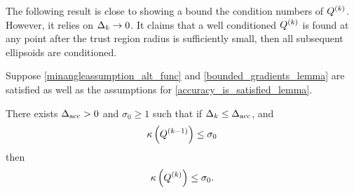 The following result is close to showing a bound the condition numbers of ${Q^{(k)}}$.
However, it relies on $\Delta_k \to 0$.
It claims that a well conditioned ${Q^{(k)}}$ is found at any point after the trust region radius is sufficiently small, then all subsequent ellipsoids are conditioned.


\begin{lemma}

Suppose \cref{minangleassumption_alt_func} and \cref{bounded_gradients_lemma} are satisfied as well as the assumptions for \cref{accuracy_is_satisfied_lemma}.

There exists ${\Delta_{\textrm{acc}}} > 0$ and $\sigma_0 \ge 1$ such that if $\Delta_k \le {\Delta_{\textrm{acc}}}$, and
\begin{align}
{\kappa} \left( Q^{(k-1)} \right) \le \sigma_0 \label{idk_alt_proof_statement1}
\end{align}
then 
\begin{align}
{\kappa} \left( {Q^{(k)}} \right) \le \sigma_0. \label{idk_alt_proof_statement2}
\end{align}
\end{lemma}


